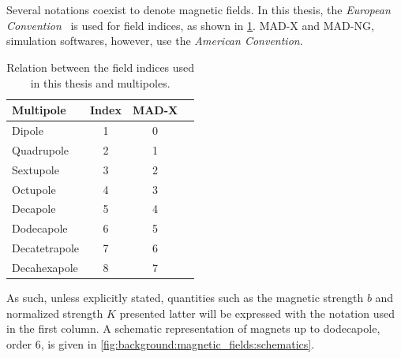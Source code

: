 \section{}

\subsection{}

Several notations coexist to denote magnetic fields. In this thesis, the
\textit{European Convention}~\cite{dilly_corrections_2022} is used for field indices, as shown
in \cref{tab:magnetic_fields:relation_indices}. MAD-X and MAD-NG, simulation softwares, however, use the
\textit{American Convention}. 

\begin{table}[H]
    \centering
    \begin{tabular}{lccc}
    \toprule
        Multipole     &     Index         &      MAD-X      \\
    \midrule                              
        Dipole        &     1             &     0           \\
        Quadrupole    &     2             &     1           \\
        Sextupole     &     3             &     2           \\
        Octupole      &     4             &     3           \\
        Decapole      &     5             &     4           \\
        Dodecapole    &     6             &     5           \\
        Decatetrapole &     7             &     6           \\
        Decahexapole  &     8             &     7           \\
    \bottomrule
    \end{tabular}
    \caption{Relation between the field indices used in this thesis and multipoles.}
    \label{tab:magnetic_fields:relation_indices}
  \end{table}

As such, unless explicitly stated, quantities such as the magnetic strength $b$ and normalized
strength $K$ presented latter will be expressed with the notation used in the first column. 
A schematic representation of magnets up to dodecapole, order 6, is given in
\cref{fig:background:magnetic_fields:schematics}.

